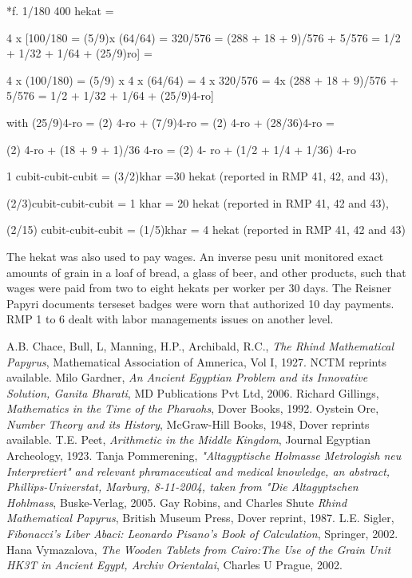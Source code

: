 \documentclass[12pt]{article}
\begin{document}
*f. 1/180 400 hekat = 

4 x [100/180 = (5/9)x (64/64) = 320/576 = (288 + 18 + 9)/576 + 5/576 = 1/2 + 1/32 + 1/64 + (25/9)ro] =

4 x (100/180) = (5/9) x 4 x (64/64) = 4 x 320/576 = 4x (288 + 18 + 9)/576 + 5/576 = 1/2 + 1/32 + 1/64 + (25/9)4-ro] 

with (25/9)4-ro = (2) 4-ro + (7/9)4-ro = (2) 4-ro + (28/36)4-ro = 

(2) 4-ro + (18 + 9 + 1)/36 4-ro = (2) 4- ro + (1/2 + 1/4 + 1/36) 4-ro 

1 cubit-cubit-cubit = (3/2)khar =30 hekat  (reported in RMP 41, 42, and 43),

(2/3)cubit-cubit-cubit = 1 khar = 20 hekat (reported in RMP 41, 42 and 43),

(2/15) cubit-cubit-cubit = (1/5)khar = 4 hekat (reported in RMP 41, 42 and 43)

The hekat was also used to pay wages. An inverse pesu unit monitored exact amounts of grain in a loaf of bread, a glass of beer, and other products, such that wages were paid from two to eight hekats per worker per 30 days. The Reisner Papyri documents terseset badges were worn that authorized 10 day payments. RMP 1 to 6 dealt with labor managements issues on another level. 


\begin{thebibliography}{9}
  A.B. Chace, Bull, L, Manning, H.P., Archibald, R.C., \emph{The Rhind Mathematical Papyrus}, Mathematical Association of Amnerica, Vol I, 1927. NCTM reprints available.
 Milo Gardner, \emph{An Ancient Egyptian Problem and its Innovative Solution, Ganita Bharati}, MD Publications Pvt Ltd, 2006.
Richard Gillings, \emph{Mathematics in the Time of the Pharaohs}, Dover Books, 1992.
 Oystein Ore, \emph{Number Theory and its History}, McGraw-Hill Books, 1948, Dover reprints available.
 T.E. Peet, \emph{Arithmetic in the Middle Kingdom}, Journal Egyptian Archeology, 1923.
 Tanja Pommerening, \emph{"Altagyptische Holmasse Metrologish neu Interpretiert" and relevant phramaceutical and medical knowledge, an abstract,  Phillips-Universtat, Marburg, 8-11-2004, taken from "Die Altagyptschen Hohlmass}, Buske-Verlag, 2005.
 Gay Robins, and Charles Shute \emph{Rhind Mathematical Papyrus}, British Museum Press, Dover reprint, 1987.
 L.E. Sigler, \emph{Fibonacci's Liber Abaci: Leonardo Pisano's Book of Calculation}, Springer, 2002.
 Hana Vymazalova, \emph{The Wooden Tablets from Cairo:The Use of the Grain Unit HK3T in Ancient Egypt, Archiv Orientalai}, Charles U Prague, 2002.
\end{thebibliography}



\end{document}
